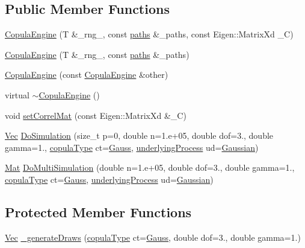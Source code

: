\subsection*{Public Member Functions}
\begin{DoxyCompactItemize}
\item 
\hyperlink{classCopulaEngine_af3eb5649a8e86dd99de690cac3e843f1}{Copula\+Engine} (T \&\+\_\+rng\+\_\+, const \hyperlink{classMCEngine_a977f1048508a1467c496c2c47231d1d3}{paths} \&\+\_\+paths, const Eigen\+::\+Matrix\+Xd \+\_\+C)
\item 
\hyperlink{classCopulaEngine_a26fa5d1a9a5cb3fe2f406a63049fe4e9}{Copula\+Engine} (T \&\+\_\+rng\+\_\+, const \hyperlink{classMCEngine_a977f1048508a1467c496c2c47231d1d3}{paths} \&\+\_\+paths)
\item 
\hyperlink{classCopulaEngine_a2f0ff634cdaaa44f21f2ccd3c583d918}{Copula\+Engine} (const \hyperlink{classCopulaEngine}{Copula\+Engine} \&other)
\item 
virtual \hyperlink{classCopulaEngine_aadcd0c2890899853db28a2269be09745}{$\sim$\+Copula\+Engine} ()
\item 
void \hyperlink{classCopulaEngine_a0a330b7405b9cfcb205aaf6db1d954c3}{set\+Correl\+Mat} (const Eigen\+::\+Matrix\+Xd \&\+\_\+C)
\item 
\hyperlink{compute__returns__eigen_8h_a1eb6a9306ef406d7975f3cbf2e247777}{Vec} \hyperlink{classCopulaEngine_ac14e86c4f0025bcc82e680896e1c7e3a}{Do\+Simulation} (size\+\_\+t p=0, double n=1.e+05, double dof=3., double gamma=1., \hyperlink{rng_8h_aff2c6be1fded3d6d996b850e2eb87c25}{copula\+Type} ct=\hyperlink{rng_8h_aff2c6be1fded3d6d996b850e2eb87c25ab15a7891aa5223439e4692a1048cb220}{Gauss}, \hyperlink{mc__engine_8h_aeb3b337d49b67199ac031f705d206198}{underlying\+Process} ud=\hyperlink{mc__engine_8h_aeb3b337d49b67199ac031f705d206198aa11844f44df96808eb4e519ba04f088c}{Gaussian})
\item 
\hyperlink{compute__returns__eigen_8h_ae14dd28696f743e067dbd2594616bad6}{Mat} \hyperlink{classCopulaEngine_a7074287ea29264912673d2d12d38bcdc}{Do\+Multi\+Simulation} (double n=1.e+05, double dof=3., double gamma=1., \hyperlink{rng_8h_aff2c6be1fded3d6d996b850e2eb87c25}{copula\+Type} ct=\hyperlink{rng_8h_aff2c6be1fded3d6d996b850e2eb87c25ab15a7891aa5223439e4692a1048cb220}{Gauss}, \hyperlink{mc__engine_8h_aeb3b337d49b67199ac031f705d206198}{underlying\+Process} ud=\hyperlink{mc__engine_8h_aeb3b337d49b67199ac031f705d206198aa11844f44df96808eb4e519ba04f088c}{Gaussian})
\end{DoxyCompactItemize}
\subsection*{Protected Member Functions}
\begin{DoxyCompactItemize}
\item 
\hyperlink{compute__returns__eigen_8h_a1eb6a9306ef406d7975f3cbf2e247777}{Vec} \hyperlink{classCopulaEngine_a9e74792c12cbe443f77221466b851aec}{\+\_\+generate\+Draws} (\hyperlink{rng_8h_aff2c6be1fded3d6d996b850e2eb87c25}{copula\+Type} ct=\hyperlink{rng_8h_aff2c6be1fded3d6d996b850e2eb87c25ab15a7891aa5223439e4692a1048cb220}{Gauss}, double dof=3., double gamma=1.)
\end{DoxyCompactItemize}
